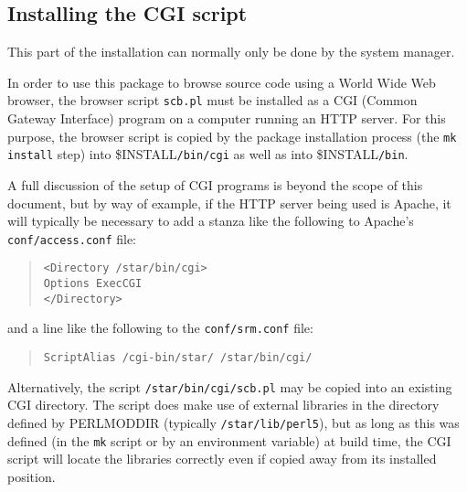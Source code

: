 \documentclass[twoside,11pt]{article}
\newcommand{\htmladdnormallink}[2]{#1}
\newcommand{\xlabel}[1]{}
\renewcommand{\_}{\texttt{\symbol{95}}}
\begin{document}
\subsection{\xlabel{sec:install-cgi}Installing the CGI script}

This part of the installation can normally only be done by 
the system manager.

In order to use this package to browse source code using a
World Wide Web browser, the browser script {\tt scb.pl}
must be installed as a CGI (Common Gateway Interface) program
on a computer running an HTTP server.  
For this purpose, the browser script is copied by the package
installation process (the {\tt mk install} step) 
into \$INSTALL{\tt /bin/cgi} as well as into \$INSTALL{\tt /bin}.

A full discussion of the setup of CGI programs is
beyond the scope of this document, but by way of example, 
if the HTTP server being used is 
\htmladdnormallink{Apache}{http://www.apache.org/}, 
it will typically 
be necessary to
add a stanza like the following to Apache's {\tt conf/access.conf} file:
\begin{quote}
\begin{verbatim}
<Directory /star/bin/cgi>
Options ExecCGI
</Directory>
\end{verbatim}
\end{quote}
and a line like the following to the {\tt conf/srm.conf} file:
\begin{quote}
\begin{verbatim}
ScriptAlias /cgi-bin/star/ /star/bin/cgi/
\end{verbatim}
\end{quote}
Alternatively, the script {\tt /star/bin/cgi/scb.pl} may be copied 
into an existing CGI directory.
The script does make use of external libraries in the directory 
defined by PERL\_MOD\_DIR (typically {\tt /star/lib/perl5}), 
but as long as this was
defined (in the {\tt mk} script or by an environment variable)
at build time, the CGI script will locate the libraries correctly
even if copied away from its installed position.
\end{document}
